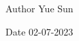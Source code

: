 \begin{DoxyAuthor}{Author}
Yue Sun 
\end{DoxyAuthor}
\begin{DoxyDate}{Date}
02-\/07-\/2023 
\end{DoxyDate}

